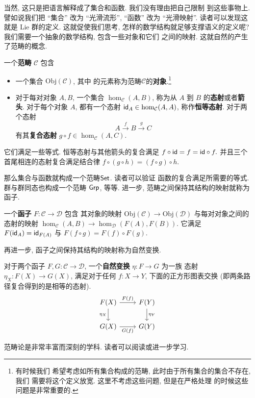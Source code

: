 当然, 这只是把语言解释成了集合和函数. 我们没有理由把自己限制
到这些事物上. 譬如说我们把 “集合” 改为 “光滑流形”,
“函数” 改为 “光滑映射”. 读者可以发现这就是 Lie 群的定义.
这就促使我们思考, 怎样的数学结构就足够支撑语义的定义呢?
我们需要一个抽象的数学结构, 包含一些对象和它们
之间的映射. 这就自然的产生了范畴的概念.
\begin{definition}
一个\textbf{范畴} \(\mathcal C\) 包含
\begin{itemize}
\item 一个集合 \(\mathrm{Obj}(\mathcal C)\), 其中
的元素称为范畴\(\mathcal C\)的\textbf{对象}.\footnote{有时候我们
希望考虑如所有集合构成的范畴, 此时由于所有集合的集合不存在, 我们
需要将这个定义放宽. 这里不考虑这些问题, 但是在严格处理
的时候这些问题是非常重要的.}
\item 对于每对对象 \(A,B\), 一个集合 \(\hom_{\mathcal C}(A,B)\),
称为从 \(A\) 到 \(B\) 的\textbf{态射}或者\textbf{箭头}.
对于每个对象 \(A\), 都有一个态射
\(\textsf{id}_A \in \hom_{\mathcal C}(A,A)\), 称作\textbf{恒等态射}. 对于两个态射
\[A \xrightarrow f B \xrightarrow g C\]
有其\textbf{复合态射} \(g\circ f \in \hom_{\mathcal C}(A, C)\).
\end{itemize}
它们满足一些等式. 恒等态射与其他箭头的复合满足
\(f \circ \textsf{id} = f = \textsf{id} \circ f.\)
并且三个首尾相连的态射复合满足结合律
\(f\circ (g\circ h) = (f\circ g)\circ h.\)
\end{definition}

那么集合与函数就构成一个范畴\(\textsf{Set}\). 读者可以验证
函数的复合满足所需要的等式. 群与群同态也构成一个范畴 \(\textsf{Grp}\),
等等. 进一步, 范畴之间保持其结构的映射就称为函子.
\begin{definition}
一个\textbf{函子} \(F : \mathcal C \to \mathcal D\) 包含
其对象的映射 \(\mathrm{Obj}(\mathcal C)
\to \mathrm{Obj}(\mathcal D)\) 与每对对象之间的
态射的映射 \(\hom_{\mathcal C}(A,B) \to \hom_{\mathcal D}(F(A), F(B))\).
它满足 \(F(\textsf{id}_A) = \textsf{id}_{F(A)}\) 与
\(F(f \circ g) = F(f)\circ F(g)\).
\end{definition}
再进一步, 函子之间保持其结构的映射称为自然变换.
\begin{definition}
对于两个函子 \(F,G : \mathcal C \to\mathcal D\),
一个\textbf{自然变换} \(\eta : F \to G\) 为一族
态射 \(\eta_X : F(X) \to G(X)\), 满足对于任何
\(f : X \to Y\), 下面的正方形图表交换 (即两条路径复合得到的是相等的态射).
\[\begin{tikzcd}
{F(X)} & {F(Y)} \\
{G(X)} & {G(Y)}
\arrow["{\eta_X}"', from=1-1, to=2-1]
\arrow["{\eta_Y}", from=1-2, to=2-2]
\arrow["{F(f)}", from=1-1, to=1-2]
\arrow["{G(f)}"', from=2-1, to=2-2]
\end{tikzcd}\]
\end{definition}
范畴论是非常丰富而深刻的学科.
读者可以阅读\cite{smith:2018:category}或\cite{maclane:1971:category}进一步学习.

